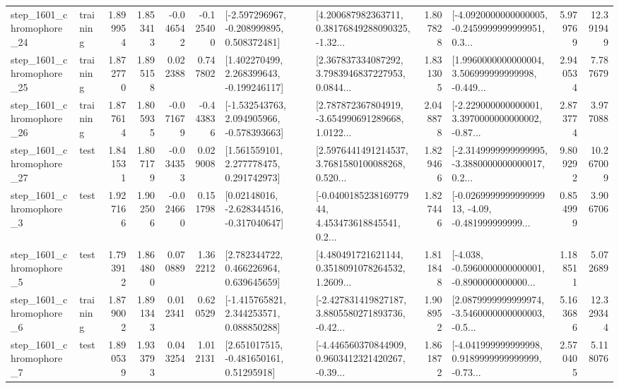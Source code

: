 \begin{tabular}{llrrrrllrlrr}
 step\_1601\_chromophore\_24 &  training &      1.899954 &    1.853413 &     -0.046542 & -0.125400 &   [-2.597296967, -0.208999895, 0.508372481] &  [4.200687982363711, 0.38176849288090325, -1.32... &       1.807828 &  [-4.0920000000000005, -0.2459999999999951, 0.3... &            5.979769 &         12.391949 \\
 step\_1601\_chromophore\_25 &  training &      1.872770 &    1.895158 &      0.022388 &  0.747802 &    [1.402270499, 2.268399643, -0.199246117] &  [2.367837334087292, 3.7983946837227953, 0.0844... &       1.831305 &  [1.9960000000000004, 3.506999999999998, -0.449... &            2.940534 &          7.787679 \\
 step\_1601\_chromophore\_26 &  training &      1.877614 &    1.805935 &     -0.071679 & -0.443836 &   [-1.532543763, 2.094905966, -0.578393663] &  [2.787872367804919, -3.654990691289668, 1.0122... &       2.048878 &  [-2.229000000000001, 3.3970000000000002, -0.87... &            2.873774 &          3.977088 \\
 step\_1601\_chromophore\_27 &      test &      1.841531 &    1.807179 &     -0.034353 &  0.029008 &     [1.561559101, 2.277778475, 0.291742973] &  [2.5976441491214537, 3.7681580100088268, 0.520... &       1.829466 &  [-2.3149999999999995, -3.3880000000000017, 0.2... &            9.809292 &         10.267009 \\
  step\_1601\_chromophore\_3 &      test &      1.927166 &    1.902506 &     -0.024660 &  0.151798 &    [0.02148016, -2.628344516, -0.317040647] &  [-0.040018523816977944, 4.453473618845541, 0.2... &       1.827446 &  [-0.026999999999999913, -4.09, -0.481999999999... &            0.854999 &          3.906706 \\
  step\_1601\_chromophore\_5 &      test &      1.793912 &    1.864800 &      0.070889 &  1.362212 &     [2.782344722, 0.466226964, 0.639645659] &  [4.480491721621144, 0.3518091078264532, 1.2609... &       1.811848 &  [-4.038, -0.5960000000000001, -0.8900000000000... &            1.188511 &          5.072689 \\
  step\_1601\_chromophore\_6 &  training &      1.879002 &    1.891343 &      0.012341 &  0.620529 &    [-1.415765821, 2.344253571, 0.088850288] &  [-2.427831419827187, 3.8805580271893736, -0.42... &       1.908952 &  [2.0879999999999974, -3.5460000000000003, -0.5... &            5.163686 &         12.329344 \\
  step\_1601\_chromophore\_7 &      test &      1.890539 &    1.933793 &      0.043254 &  1.012131 &     [2.651017515, -0.481650161, 0.51295918] &  [-4.446560370844909, 0.9603412321420267, -0.39... &       1.861872 &  [-4.041999999999998, 0.9189999999999999, -0.73... &            2.570405 &          5.118076 \\

\end{tabular}
